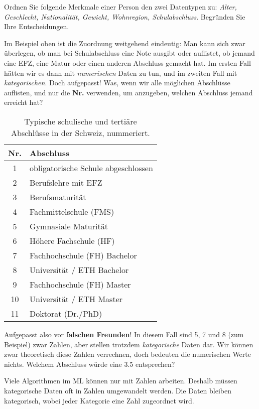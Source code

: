 \begin{lpu}
\begin{aufgabe}{2}
Ordnen Sie folgende Merkmale einer Person den zwei Datentypen zu: \emph{Alter, Geschlecht, Nationalit\"at, Gewicht, Wohnregion, Schulabschluss}. Begr\"unden Sie Ihre Entscheidungen.
\end{aufgabe}

Im Beispiel oben ist die Zuordnung weitgehend eindeutig: Man kann sich zwar überlegen, ob man bei Schulabschluss eine Note ausgibt oder auflistet, ob jemand eine EFZ, eine Matur oder einen anderen Abschluss gemacht hat. Im ersten Fall hätten wir es dann mit \textit{numerischen} Daten zu tun, und im zweiten Fall mit \textit{kategorischen}. Doch aufgepasst! Was, wenn wir alle möglichen Abschlüsse auflisten, und nur die \textbf{Nr.} verwenden, um anzugeben, welchen Abschluss jemand erreicht hat?

\begin{table}
\begin{center}
\begin{tabular}{|c|l|}
\hline
\textbf{Nr.} & \textbf{Abschluss} \\
\hline
1 & obligatorische Schule abgeschlossen \\
2 & Berufslehre mit EFZ \\
3 & Berufsmaturität \\
4 & Fachmittelschule (FMS) \\
5 & Gymnasiale Maturität \\
6 & Höhere Fachschule (HF) \\
7 & Fachhochschule (FH) Bachelor \\
8 & Universität / ETH Bachelor \\
9 & Fachhochschule (FH) Master \\
10 & Universität / ETH Master \\
11 & Doktorat (Dr./PhD) \\
\hline
\end{tabular}
\caption{Typische schulische und tertiäre Abschlüsse in der Schweiz, nummeriert.}
\label{tab:abschluesse}
\end{center}
\end{table}

Aufgepasst also vor \textbf{falschen Freunden}! In diesem Fall sind 5, 7 und 8 (zum Beispiel) zwar Zahlen, aber stellen trotzdem \textit{kategorische} Daten dar. Wir können zwar theoretisch diese Zahlen verrechnen, doch bedeuten die numerischen Werte nichts. Welchem Abschluss würde eine 3.5 entsprechen?

\begin{theorie}
Viele Algorithmen im ML k\"onnen nur mit Zahlen arbeiten. Deshalb m\"ussen kategorische Daten oft in Zahlen umgewandelt werden. Die Daten bleiben kategorisch, wobei jeder Kategorie eine Zahl zugeordnet wird.
\end{theorie}


\end{lpu}
